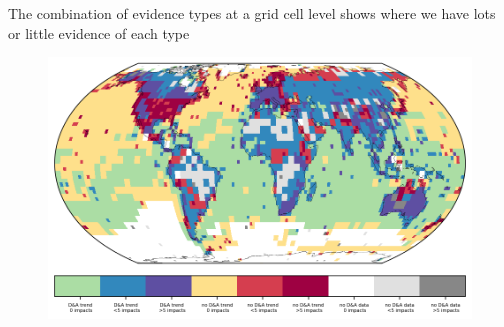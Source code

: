 \documentclass[9pt]{beamer}
\begin{document}
\begin{frame}{The combination of evidence types at a grid cell level shows where we have lots or little evidence of each type}

\begin{figure}
	\includegraphics[width=\linewidth]{../plots/maps/gridcells_da_studies_temp_2_5_global.png}
\end{figure}

\end{frame}
\end{document}
